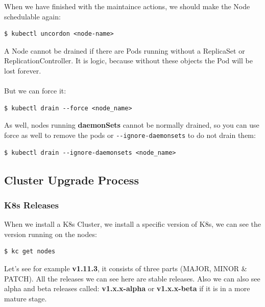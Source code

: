 \documentclass{article}
\newenvironment{blocktemplateIII}[1]{%
    \tcolorbox[beamer,%
    noparskip,breakable,
    ,colframe=Red,%
    colbacklower=LimeGreen!75!LightGreen,%
    title=#1]}%
    {\endtcolorbox}
\newenvironment{codetemplate}[1][]{%
  \mybasecolorbox[#1]
  \itshape
}{%
  \endmybasecolorbox
}
\begin{document}
When we have finished with the maintaince actions, we should make the Node schedulable again:
\begin{codetemplate}{}
\begin{verbatim}
$ kubectl uncordon <node-name>
\end{verbatim}
\end{codetemplate}

\begin{blocktemplateIII}{WARNING}
A Node cannot be drained if there are Pods running without a ReplicaSet or ReplicationController. It is logic, because without these objects the Pod will be lost forever.
\\\\
But we can force it:
\begin{codetemplate}{}
\begin{verbatim}
$ kubectl drain --force <node_name>
\end{verbatim}
\end{codetemplate}
As well, nodes running \textbf{daemonSets} cannot be normally drained, so you can use force as well to remove the pods or \verb|--ignore-daemonsets| to do not drain them:
\begin{codetemplate}{}
\begin{verbatim}
$ kubectl drain --ignore-daemonsets <node_name>
\end{verbatim}
\end{codetemplate}
\end{blocktemplateIII}

\subsection{Cluster Upgrade Process}

\subsubsection{K8s Releases}
When we install a K8s Cluster, we install a specific version of K8s, we can see the version running on the nodes:

\begin{codetemplate}{}
\begin{verbatim}
$ kc get nodes
\end{verbatim}
\end{codetemplate}

Let's see for example \textbf{v1.11.3}, it consists of three parts (MAJOR, MINOR \& PATCH). All the releases we can see here are stable releases. Also we can also see alpha and beta releases called: \textbf{v1.x.x-alpha} or \textbf{v1.x.x-beta} if it is in a more mature stage.
\end{document}
